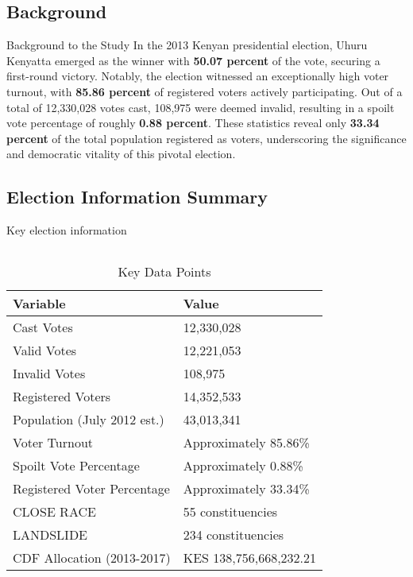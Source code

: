 \documentclass{beamer}
\begin{document}
\subsection{Background}

\begin{frame}{Background to the Study}
In the 2013 Kenyan presidential election, Uhuru Kenyatta emerged as the winner with \textbf{50.07 percent} of the vote, securing a first-round victory. Notably, the election witnessed an exceptionally high voter turnout, with \textbf{85.86 percent} of registered voters actively participating. Out of a total of 12,330,028 votes cast, 108,975 were deemed invalid, resulting in a spoilt vote percentage of roughly \textbf{0.88 percent}. These statistics reveal only \textbf{33.34 percent} of the total population registered as voters, underscoring the significance and democratic vitality of this pivotal election.
\end{frame}

\subsection{Election Information Summary}
\begin{frame}{Key election information}
\begin{columns}[c] %
\begin{table}
\centering
\begin{tabular}{|l|l|}
\hline
\textbf{Variable} & \textbf{Value} \\
\hline
Cast Votes & 12,330,028 \\
Valid Votes & 12,221,053 \\
Invalid Votes & 108,975 \\
Registered Voters & 14,352,533 \\
Population (July 2012 est.) & 43,013,341 \\
Voter Turnout & Approximately 85.86\% \\
Spoilt Vote Percentage & Approximately 0.88\% \\
Registered Voter Percentage & Approximately 33.34\% \\
CLOSE RACE & 55 constituencies \\
LANDSLIDE & 234 constituencies \\
CDF Allocation (2013-2017) & KES 138,756,668,232.21 \\
\hline
\end{tabular}
\caption{Key Data Points}
\end{table}
\end{columns}
\end{frame}
\end{document}
